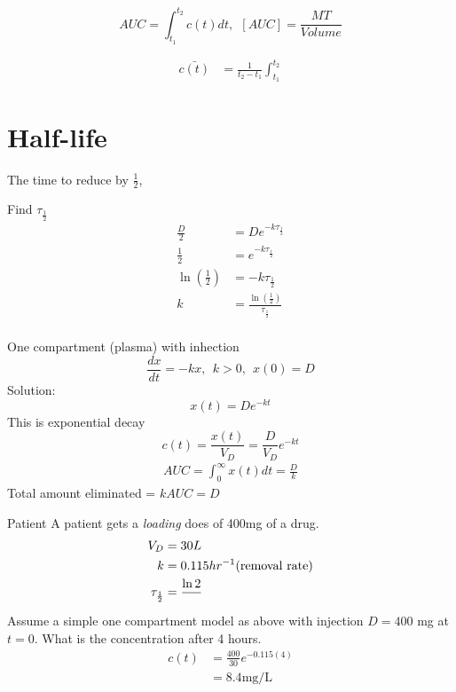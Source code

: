 \documentclass[
	date={September 11{,} 2024}
]{math486notes}
\begin{document}
\[ AUC = \int_{t_{1}}^{t_{2}} c(t)dt,\ \ [AUC] = \frac{MT}{Volume}  \]

\begin{equation*}
\begin{aligned}
	\bar{c(t)} &= \frac{1}{t_{2} - t_{1}}\int_{t_{1}}^{t_{2}}
\end{aligned}
\end{equation*}

\section{Half-life}\label{sec:half-life}
The time to reduce by $\frac{1}{2}$,
\begin{example}{Find $\tau_{\frac{1}{2}}$}
	\begin{equation*}
	\begin{aligned}
		\frac{D}{2} &= De^{-k\tau_{\frac{1}{2}}}\\
		\frac{1}{2} &= e^{-k\tau_{\frac{1}{2}}}\\
		\ln\left( \frac{1}{2} \right) &= -k\tau_{\frac{1}{2}}\\
		k &= \frac{\ln\left( \frac{1}{2} \right)}{\tau_{\frac{1}{2}}}\\
	\end{aligned}
	\end{equation*}
\end{example}

\begin{example}
	One compartment (plasma) with inhection
	\[ \frac{dx}{dt} = -kx,\ \ k > 0,\ \ x(0) = D \]
	Solution:
	\[ x(t) = De^{-kt} \]
	This is exponential decay
	\begin{equation}
		c(t) = \frac{x(t)}{V_{D}} = \frac{D}{V_{D}}e^{-kt}
		\label{eq:auc-for-example}
	\end{equation}
	\begin{equation*}
	\begin{aligned}
		AUC = \int_{0}^{\infty} x(t)dt = \frac{D}{k}
	\end{aligned}
	\end{equation*}
	Total amount eliminated = $kAUC = D$
\end{example}

\begin{example}{Patient}
	A patient gets a \emph{loading} does of 400mg of a drug.
	\begin{equation*}
	\begin{aligned}
		V_{D} &= 30L\\
		k &= 0.115 hr^{-1} (\mbox{removal rate})\\
		\tau_{\frac{1}{2}} &= \frac{\ln 2}{}
	\end{aligned}
	\end{equation*}
	Assume a simple one compartment model as above with injection $D=400$ mg at $t=0$. What is the concentration after 4 hours.
	\begin{equation*}
	\begin{aligned}
		c(t) &= \frac{400}{30}e^{-0.115(4)}\\
			 &= 8.4 \mbox{mg}/\mbox{L}
	\end{aligned}
	\end{equation*}
\end{example}
\end{document}
